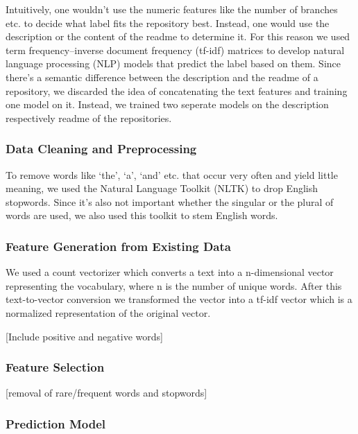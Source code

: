 \documentclass[a4paper,12pt]{article}
\begin{document}
Intuitively, one wouldn't use the numeric features like the number of
branches etc. to decide what label fits the repository best. Instead,
one would use the description or the content of the readme to determine
it. For this reason we used term frequency--inverse document frequency
(tf-idf) matrices to develop natural language processing (NLP) models
that predict the label based on them. Since there's a semantic
difference between the description and the readme of a repository, we
discarded the idea of concatenating the text features and training one
model on it. Instead, we trained two seperate models on the description
respectively readme of the repositories.

\subsubsection{Data Cleaning and
Preprocessing}\label{data-cleaning-and-preprocessing-1}

To remove words like `the', `a', `and' etc. that occur very often and
yield little meaning, we used the Natural Language Toolkit (NLTK) to
drop English stopwords. Since it's also not important whether the
singular or the plural of words are used, we also used this toolkit to
stem English words.

\subsubsection{Feature Generation from Existing
Data}\label{feature-generation-from-existing-data}

We used a count vectorizer which converts a text into a n-dimensional
vector representing the vocabulary, where n is the number of unique
words. After this text-to-vector conversion we transformed the vector
into a tf-idf vector which is a normalized representation of the
original vector.

[Include positive and negative words]

\subsubsection{Feature Selection}\label{feature-selection-1}

{[}removal of rare/frequent words and stopwords{]}

\subsubsection{Prediction Model}\label{prediction-model-1}
\end{document}
